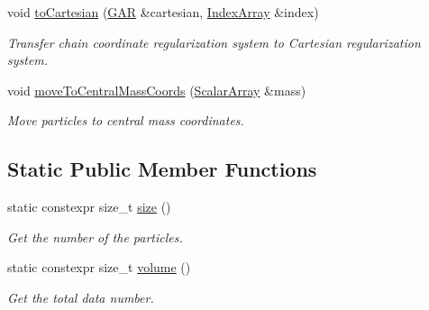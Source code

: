\begin{DoxyCompactItemize}
void \mbox{\hyperlink{class_g_a_r_a2a282218e90ffb1a367da364b70e54a3}{to\+Cartesian}} (\mbox{\hyperlink{class_g_a_r}{G\+AR}} \&cartesian, \mbox{\hyperlink{class_g_a_r_aaf033049c0cd8f0f86a82b9595086fa5}{Index\+Array}} \&index)
\begin{DoxyCompactList}\small\item\em Transfer chain coordinate regularization system to Cartesian regularization system. \end{DoxyCompactList}\item 
void \mbox{\hyperlink{class_g_a_r_a373d938047a04b051683ee93198b1832}{move\+To\+Central\+Mass\+Coords}} (\mbox{\hyperlink{class_g_a_r_a0b446684ae922457a3bf86c904085d8a}{Scalar\+Array}} \&mass)
\begin{DoxyCompactList}\small\item\em Move particles to central mass coordinates. \end{DoxyCompactList}\end{DoxyCompactItemize}
\subsection*{Static Public Member Functions}
\begin{DoxyCompactItemize}
\item 
static constexpr size\+\_\+t \mbox{\hyperlink{class_g_a_r_a850c24cdfd1656389e3e42f575035edb}{size}} ()
\begin{DoxyCompactList}\small\item\em Get the number of the particles. \end{DoxyCompactList}\item 
static constexpr size\+\_\+t \mbox{\hyperlink{class_g_a_r_abdbcc31db058125bd2ee207e7648b20b}{volume}} ()
\begin{DoxyCompactList}\small\item\em Get the total data number. \end{DoxyCompactList}\end{DoxyCompactItemize}
